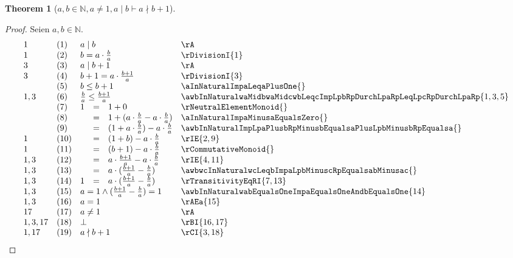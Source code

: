 \documentclass{book}
\theoremstyle{plain}
\newtheorem{theorem}{Theorem}
\theoremstyle{remark}
\theoremstyle{definition}
\begin{document}
\label{awbInNaturalwaNotEqualsOnewaMidbImpaNMidbPlusOne}
\begin{theorem}[\(a,b\in\mathbb{N}, a\neq 1, a\mid b \vdash a\nmid b+1\)]
\end{theorem}
\begin{proof}
Seien \(a,b\in\mathbb{N}\).
    \[
	\begin{array}{llclll}
        1       &  (1)  & \multicolumn{3}{l}{a\mid b} & \rA \\
        1       &  (2)  & \multicolumn{3}{l}{b=a\cdot \frac{b}{a}} & \rDivisionI{1} \\
        3       &  (3)  & \multicolumn{3}{l}{a\mid b+1} & \rA \\
        3       &  (4)  & \multicolumn{3}{l}{b+1=a\cdot \frac{b+1}{a}} & \rDivisionI{3} \\
                &  (5)  & \multicolumn{3}{l}{b\leq b+1} & \aInNaturalImpaLeqaPlusOne{} \\
        1,3     &  (6)  & \multicolumn{3}{l}{\frac{b}{a}\leq \frac{b+1}{a}} & \awbInNaturalwaMidbwaMidcwbLeqcImpLpbRpDurchLpaRpLeqLpcRpDurchLpaRp{1,3,5} \\
                &  (7)  & 1&=&1+0 & \rNeutralElementMonoid{} \\
                &  (8)  &  &=&1+(a\cdot\frac{b}{a}-a\cdot\frac{b}{a}) & \aInNaturalImpaMinusaEqualsZero{} \\
                &  (9)  &  &=&(1+a\cdot\frac{b}{a})-a\cdot\frac{b}{a} & \awbInNaturalImpLpaPlusbRpMinusbEqualsaPlusLpbMinusbRpEqualsa{} \\
        1       &  (10)  &  &=&(1+b)-a\cdot\frac{b}{a} & \rIE{2,9} \\
        1       &  (11)  &  &=&(b+1)-a\cdot\frac{b}{a} & \rCommutativeMonoid{} \\
        1,3     &  (12)  &  &=&a\cdot \frac{b+1}{a}-a\cdot\frac{b}{a} & \rIE{4,11} \\
        1,3     &  (13)  &  &=&a\cdot(\frac{b+1}{a}-\frac{b}{a}) & \awbwcInNaturalwcLeqbImpaLpbMinuscRpEqualsabMinusac{} \\
        1,3     &  (14)  & 1&=&a\cdot(\frac{b+1}{a}-\frac{b}{a}) & \rTransitivityEqRI{7,13} \\
        1,3     &  (15)  & \multicolumn{3}{l}{a=1\land (\frac{b+1}{a}-\frac{b}{a})=1 } & \awbInNaturalwabEqualsOneImpaEqualsOneAndbEqualsOne{14} \\
        1,3     &  (16)  & \multicolumn{3}{l}{a=1 } & \rAEa{15} \\
        17     &  (17)  & \multicolumn{3}{l}{a\neq 1 } & \rA \\
        1,3,17     &  (18)  & \multicolumn{3}{l}{\bot} & \rBI{16,17} \\
        1,17     &  (19)  & \multicolumn{3}{l}{a\nmid b+1} & \rCI{3,18} \\
        \end{array}
    \]
\end{proof}
\end{document}
